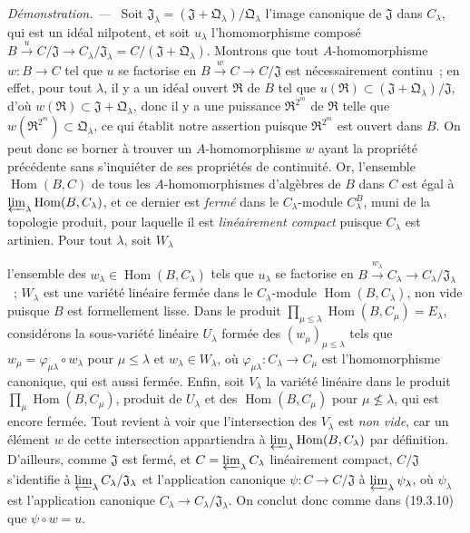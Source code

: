 \documentclass[10pt,oneside]{book}
\newcommand{\oldpage}[2][]{%
  \setcounter{footnote}{0}%
  \marginpar{\scriptsize\textbf{#1}~|~#2}\ignorespaces}
\newenvironment{proof}{%
  \par\medskip\noindent\textit{Démonstration. ---\ }}{\par}
\begin{document}
\begin{proof}
Soit $\mathfrak J_\lambda=(\mathfrak J+\mathfrak Q_\lambda)/\mathfrak Q_\lambda$
l'image canonique de $\mathfrak J$ dans $C_\lambda$, qui est un idéal
nilpotent, et soit $u_\lambda$ l'homomorphisme composé
$B\xrightarrow{u}C/\mathfrak J\to C_\lambda/\mathfrak J_\lambda
=C/(\mathfrak J+\mathfrak Q_\lambda)$. Montrons que tout
$A$-homomorphisme $w:B\to C$ tel que $u$ se factorise en
$B\xrightarrow{w}C\to C/\mathfrak J$ est nécessairement continu~; en
effet, pour tout $\lambda$, il y a un idéal ouvert $\mathfrak R$ de $B$
tel que $u(\mathfrak R)\subset
(\mathfrak J+\mathfrak Q_\lambda)/\mathfrak J$, d'où
$w(\mathfrak R)\subset\mathfrak J+\mathfrak Q_\lambda$, donc il y a
une puissance $\mathfrak R^{2^m}$ de $\mathfrak R$ telle que
$w(\mathfrak R^{2^m})\subset\mathfrak Q_\lambda$, ce qui établit
notre assertion puisque $\mathfrak R^{2^m}$ est ouvert dans $B$. On peut
donc se borner à trouver un $A$-homomorphisme $w$ ayant la propriété précédente
sans s'inquiéter de ses propriétés de continuité. Or, l'ensemble
$\operatorname{Hom}(B,C)$ de tous les $A$-homomorphismes d'algèbres de $B$
dans $C$ est égal à
$\varprojlim_\lambda\operatorname{Hom}(B,C_\lambda)$, et ce dernier est
\emph{fermé} dans le $C_\lambda$-module $C_\lambda^B$, muni de la topologie
produit, pour laquelle il est \emph{linéairement compact} puisque
  $C_\lambda$ est artinien. Pour tout $\lambda$, soit $W_\lambda$

\oldpage[0\textsubscript{IV-1}]{86}

l'ensemble des $w_\lambda\in\operatorname{Hom}(B,C_\lambda)$ tels que
$u_\lambda$ se factorise en
$B\xrightarrow{w_\lambda}C_\lambda\to
C_\lambda/\mathfrak J_\lambda$~; $W_\lambda$ est une variété
linéaire fermée dans le $C_\lambda$-module
  $\operatorname{Hom}(B,C_\lambda)$, non vide puisque $B$ est formellement
  lisse. Dans le produit
$\prod_{\mu\leq\lambda}\operatorname{Hom}(B,C_\mu)=E_\lambda$,
considérons la sous-variété linéaire $U_\lambda$ formée des
$(w_\mu)_{\mu\leq\lambda}$ tels que
$w_\mu=\varphi_{\mu\lambda}\circ w_\lambda$ pour
$\mu\leq\lambda$ et $w_\lambda\in W_\lambda$, où
$\varphi_{\mu\lambda}:C_\lambda\to C_\mu$ est
l'homomorphisme canonique, qui est aussi fermée. Enfin, soit $V_\lambda$
la variété linéaire dans le produit
$\prod_\mu\operatorname{Hom}(B,C_\mu)$, produit de $U_\lambda$
et des $\operatorname{Hom}(B,C_\mu)$ pour
$\mu\not\leq\lambda$, qui est encore fermée. Tout revient à voir que
l'intersection des $V_\lambda$ est \emph{non vide}, car un élément $w$ de
cette intersection appartiendra à
$\varprojlim_\lambda\operatorname{Hom}(B,C_\lambda)$ par définition.
D'ailleurs, comme $\mathfrak J$ est fermé, et
$C=\varprojlim_\lambda C_\lambda$ linéairement compact,
$C/\mathfrak J$ s'identifie à
$\varprojlim_\lambda C_\lambda/\mathfrak J_\lambda$ et
l'application canonique $\psi:C\to C/\mathfrak J$ à
$\varprojlim_\lambda\psi_\lambda$, où $\psi_\lambda$ est
l'application canonique
$C_\lambda\to C_\lambda/\mathfrak J_\lambda$. On conclut donc
comme dans (19.3.10) que $\psi\circ w=u$.
\end{proof}
\end{document}
